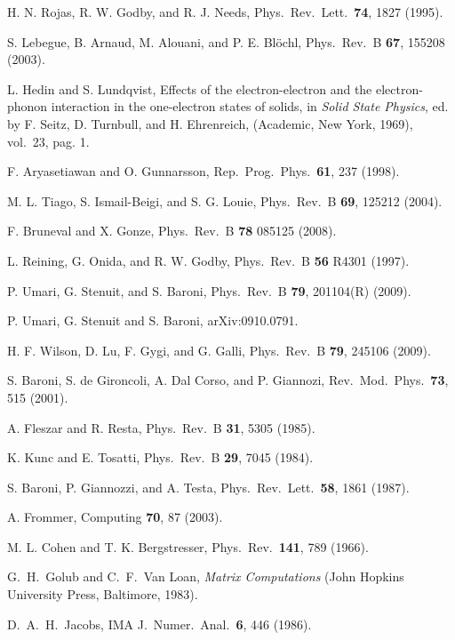 \documentclass[twocolumn,prb,showpacs,superscriptaddress]{revtex4}
\begin{document}
\begin{thebibliography}{99}
H. N. Rojas, R. W. Godby, and R. J. Needs,
Phys.\ Rev.\ Lett.\ {\bf 74}, 1827 (1995).

S. Lebegue, B. Arnaud, M. Alouani, and P. E. Bl\"ochl,
Phys.\ Rev.\ B {\bf 67}, 155208 (2003). 

L. Hedin and S. Lundqvist,
Effects of the electron-electron and the electron-phonon interaction in
the one-electron states of solids,
in {\it Solid State Physics}, ed. by F. Seitz, D. Turnbull, and
H. Ehrenreich, (Academic, New York, 1969), vol.\ 23, pag. 1.

F. Aryasetiawan and O. Gunnarsson,
Rep.\ Prog.\ Phys.\ {\bf 61}, 237 (1998). 

M. L. Tiago, S. Ismail-Beigi, and S. G. Louie,
Phys.\ Rev.\ B {\bf 69}, 125212 (2004).

F. Bruneval and X. Gonze,
Phys.\ Rev.\ B {\bf 78} 085125 (2008).

L. Reining, G. Onida, and R. W. Godby, 
Phys.\ Rev.\ B {\bf 56} R4301 (1997).

P. Umari, G. Stenuit, and S. Baroni,
Phys.\ Rev.\ B {\bf 79}, 201104(R) (2009).

P. Umari, G. Stenuit and S. Baroni,
arXiv:0910.0791.

H. F. Wilson, D. Lu, F. Gygi, and G. Galli,
Phys.\ Rev.\ B {\bf 79}, 245106 (2009).

S. Baroni, S. de Gironcoli, A. Dal Corso, and P. Giannozi, 
Rev.\ Mod.\ Phys.\ {\bf 73}, 515 (2001).

A. Fleszar and R. Resta,
Phys.\ Rev.\ B {\bf 31}, 5305 (1985).

K. Kunc and E. Tosatti,
Phys.\ Rev.\ B {\bf 29}, 7045 (1984).

S. Baroni, P. Giannozzi, and A. Testa,
Phys.\ Rev.\ Lett.\ {\bf 58}, 1861 (1987).

A. Frommer,
Computing {\bf 70}, 87 (2003).

M. L. Cohen and T. K. Bergstresser,
Phys.\ Rev.\ {\bf 141}, 789 (1966).




G.\ H.\ Golub and C.\ F.\ Van Loan, {\it Matrix Computations} (John Hopkins University Press, Baltimore, 1983).

D.\ A.\ H.\ Jacobs,
IMA J.\ Numer.\ Anal.\ {\bf 6}, 446 (1986).


\end{thebibliography}
\end{document}
